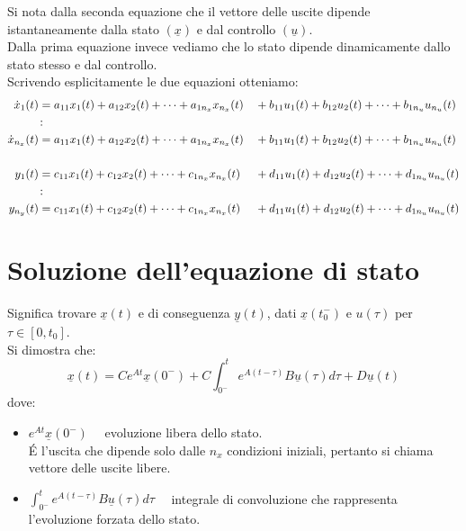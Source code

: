 \documentclass[../main.tex]{subfiles}
\begin{document}
	Si nota dalla seconda equazione che il vettore delle uscite dipende istantaneamente dalla stato $ (\underline x) $ e dal controllo $ (\underline u) $.\\
	Dalla prima equazione invece vediamo che lo stato dipende dinamicamente dallo stato stesso e dal controllo.\\
	\linebreak 
	Scrivendo esplicitamente le due equazioni otteniamo:
	\newcommand{\eq}[2]{#2_{11} #1_1(t) + #2_{12} #1_2(t) + \cdots + #2_{1n_#1} #1_{n_#1}(t)}
	\begin{align*}
		\dot x_1(t) &= \eq{x}{a} && + \eq{u}{b}\\
		&\colon\\
		\dot x_{n_x}(t) &= \eq{x}{a} && + \eq{u}{b}\\
		\smallskip\\
		y_1(t) &= \eq{x}{c} && + \eq{u}{d}\\
		&\colon\\
		y_{n_y}(t) &= \eq{x}{c} && + \eq{u}{d}\\
	\end{align*}
	\section{Soluzione dell'equazione di stato}
	Significa trovare $ \underline x(t) $ e di conseguenza $ \underline y(t) $, dati $ \underline x(t_0^-) $ e $ u(\tau) $ per $ \tau \in [0, t_0] $.\\
	Si dimostra che:
	\[ \underline x(t) = C e^{At} \underline x(0^-) + C \int_{0^-}^{t} e^{A(t-\tau)} B \underline u(\tau) d\tau + D \underline u(t) \]
	dove:
	\begin{itemize}
		\item $ e^{At} \underline x(0^-) \quad $ evoluzione libera dello stato.\\
		\'E l'uscita che dipende solo dalle $ n_x $ condizioni iniziali, pertanto si chiama vettore delle uscite libere.
		\item $ \int_{0^-}^{t} e^{A(t-\tau)} B \underline u(\tau) d\tau \quad $ integrale di convoluzione che rappresenta l'evoluzione forzata dello stato.
	\end{itemize}
\end{document}
